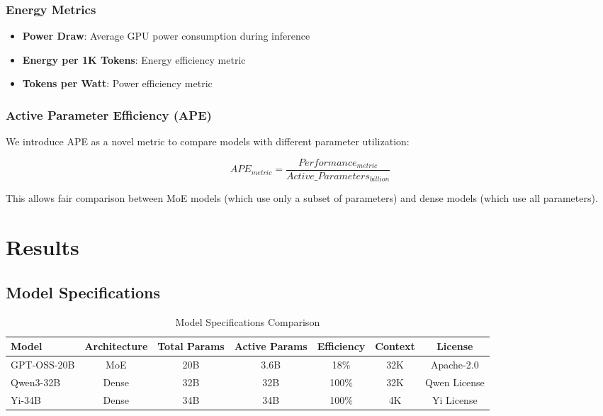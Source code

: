 \documentclass[11pt]{article}
\begin{document}
\subsubsection{Energy Metrics}
\begin{itemize}
    \item \textbf{Power Draw}: Average GPU power consumption during inference
    \item \textbf{Energy per 1K Tokens}: Energy efficiency metric
    \item \textbf{Tokens per Watt}: Power efficiency metric
\end{itemize}

\subsubsection{Active Parameter Efficiency (APE)}
We introduce APE as a novel metric to compare models with different parameter utilization:

\begin{equation}
APE_{metric} = \frac{Performance_{metric}}{Active\_Parameters_{billion}}
\end{equation}

This allows fair comparison between MoE models (which use only a subset of parameters) and dense models (which use all parameters).

\section{Results}

\subsection{Model Specifications}

\begin{table}[h]
\centering
\caption{Model Specifications Comparison}
\begin{tabular}{lcccccc}
\toprule
Model & Architecture & Total Params & Active Params & Efficiency & Context & License \\
\midrule
GPT-OSS-20B & MoE & 20B & 3.6B & 18\% & 32K & Apache-2.0 \\
Qwen3-32B & Dense & 32B & 32B & 100\% & 32K & Qwen License \\
Yi-34B & Dense & 34B & 34B & 100\% & 4K & Yi License \\
\bottomrule
\end{tabular}
\end{table}
\end{document}
